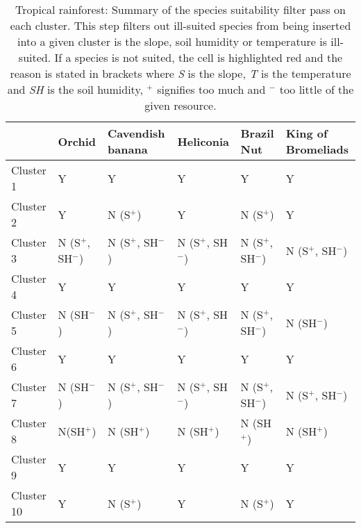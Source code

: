 \begin{table}[htb!]
  \centering
	    \begin{tabular}{|p{2cm}|p{2.5cm}|p{2.5cm}|p{2.5cm}|p{2.5cm}|p{2.5cm}|}
		\hline	
		&  \textbf{Orchid} & \textbf{Cavendish banana} & \textbf{Heliconia} & \textbf{Brazil Nut} & \textbf{King of Bromeliads}\\
		\hline	
		Cluster 1 & 
		Y & 
		Y & 
		Y & 
		Y & 
		Y \\
		\hline	
		Cluster 2 & 
		Y & 
		\cellcolor{color_red}N (S$^{+}$) & 
		Y & 
		\cellcolor{color_red}N (S$^{+}$) & 
		Y \\
		\hline	
		Cluster 3 & 
		\cellcolor{color_red}N (S$^{+}$, SH$^{-}$) & 
		\cellcolor{color_red}N (S$^{+}$, SH$^{-}$) & 
		\cellcolor{color_red}N (S$^{+}$, SH$^{-}$) & 
		\cellcolor{color_red}N (S$^{+}$, SH$^{-}$) & 
		\cellcolor{color_red}N (S$^{+}$, SH$^{-}$) \\
		\hline	
		Cluster 4 & 
		Y & 
		Y & 
		Y & 
		Y & 
		Y \\
		\hline	
		Cluster 5 & 
		\cellcolor{color_red}N (SH$^{-}$) & 
		\cellcolor{color_red}N (S$^{+}$, SH$^{-}$) & 
		\cellcolor{color_red}N (S$^{+}$, SH$^{-}$) & 
		\cellcolor{color_red}N (S$^{+}$, SH$^{-}$) & 
		\cellcolor{color_red}N (SH$^{-}$) \\
		\hline	
		Cluster 6 & 
		Y & 
		Y & 
		Y & 
		Y &
		Y \\
		\hline	
		Cluster 7 & 
		\cellcolor{color_red}N (SH$^{-}$) &
		\cellcolor{color_red}N (S$^{+}$, SH$^{-}$) &
		\cellcolor{color_red}N (S$^{+}$, SH$^{-}$) & 
		\cellcolor{color_red}N (S$^{+}$, SH$^{-}$) & 
		\cellcolor{color_red}N (S$^{+}$, SH$^{-}$) \\
		\hline	
		Cluster 8 & 
		\cellcolor{color_red}N(SH$^{+}$) & 
		\cellcolor{color_red}N (SH$^{+}$) & 
		\cellcolor{color_red}N (SH$^{+}$) & 
		\cellcolor{color_red}N (SH$^{+}$) & 
		\cellcolor{color_red}N (SH$^{+}$) \\
		\hline	
		Cluster 9 & 
		Y & 
		Y & 
		Y & 
		Y & 
		Y \\
		\hline	
		Cluster 10 &
		Y & 
		\cellcolor{color_red}N (S$^{+}$) & 
		Y & 
		\cellcolor{color_red}N (S$^{+}$) & 
		Y \\
		\hline	
		\end{tabular}
		\caption{Tropical rainforest: Summary of the species suitability filter pass on each cluster. This step filters out ill-suited species from being inserted into a given cluster is the slope, soil humidity or temperature is ill-suited. If a species is not suited, the cell is highlighted red and the reason is stated in brackets where \textit{S} is the slope, \textit{T} is the temperature and \textit{SH} is the soil humidity, $^{+}$ signifies too much and $^{-}$ too little of the given resource.}
	  \label{tab:results_tropical_species_suitability}
\end{table}

